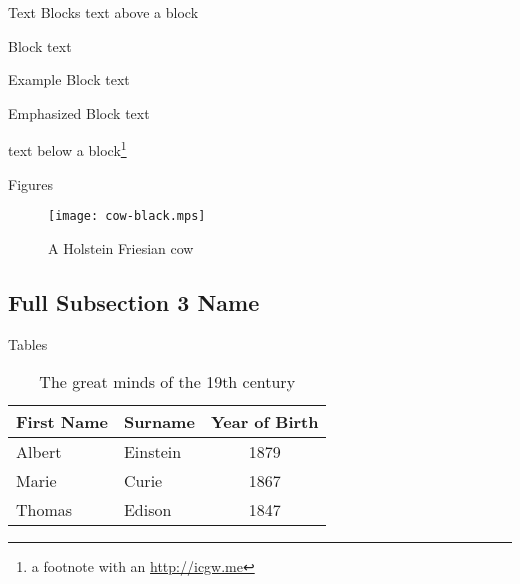 \documentclass[]{beamer}
\begin{document}
\begin{frame}{Text Blocks}
	text above a block
	\begin{block}{Block}
		text
	\end{block}
	\begin{exampleblock}{Example Block}
		text
	\end{exampleblock}
	\begin{alertblock}{Emphasized Block}
		text
	\end{alertblock}
	text below a block\footnote{a footnote with an \url{http://icgw.me}}
\end{frame}

\begin{frame}{Figures}
	\begin{figure}
		\texttt{[image: cow-black.mps]}
		\caption{A Holstein Friesian cow}
	\end{figure}
\end{frame}

\subsection[Short Subsection 3 Name]{Full Subsection 3 Name}

\begin{frame}{Tables}
	\begin{table}
		\begin{tabular}{llc}
			First Name & Surname  & Year of Birth \\ \midrule
			Albert     & Einstein & 1879          \\
			Marie      & Curie    & 1867          \\
			Thomas     & Edison   & 1847          \\
		\end{tabular}
		\caption{The great minds of the 19th century}
	\end{table}
\end{frame}
\end{document}
